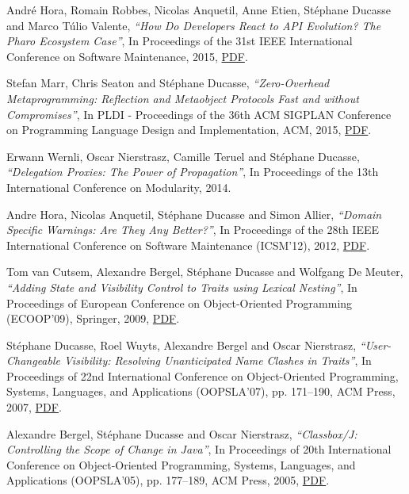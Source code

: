 \documentclass{article}
\newcommand{\czauthors}[1]{#1}
\newcommand{\cztitle}[1]{\emph{``#1''}}
\newcommand{\czbooktitle}[1]{#1}
\begin{document}
\begin{itemize}
	\pub  \czauthors{Andr\'e Hora, Romain Robbes, Nicolas Anquetil, Anne Etien, St\'ephane Ducasse and Marco T\'ulio Valente},  \cztitle{How Do Developers React to API Evolution? The Pharo Ecosystem Case},  In \czbooktitle{Proceedings of the 31st IEEE International Conference on Software Maintenance}, 2015, \href{http://rmod-files.lille.inria.fr/Team/Texts/Papers/Hora15a-icsme-api-evolution.pdf}{PDF}.

	\pub  \czauthors{Stefan Marr, Chris Seaton and St\'ephane Ducasse},  \cztitle{Zero-Overhead Metaprogramming: Reflection and Metaobject Protocols Fast and without Compromises},  In \czbooktitle{PLDI - Proceedings of the 36th ACM SIGPLAN Conference on Programming Language Design and Implementation}, ACM, 2015, \href{http://rmod-files.lille.inria.fr/Team/Texts/Papers/Marr15a-PLDI15-ZeroOverheadMetaprogramming.pdf}{PDF}.

	\pub  \czauthors{Erwann Wernli, Oscar Nierstrasz, Camille Teruel and St\'ephane Ducasse},  \cztitle{Delegation Proxies: The Power of Propagation},  In \czbooktitle{Proceedings of the 13th International Conference on Modularity}, 2014.

	\pub  \czauthors{Andre Hora, Nicolas Anquetil, St\'ephane Ducasse and Simon Allier},  \cztitle{Domain Specific Warnings: Are They Any Better?},  In \czbooktitle{Proceedings of the 28th IEEE International Conference on Software Maintenance (ICSM'12)}, 2012, \href{http://rmod-files.lille.inria.fr/Team/Texts/Papers/Hora12b-ICSM2012-DedicatedRules.pdf}{PDF}.

	\pub  \czauthors{Tom van Cutsem, Alexandre Bergel, St\'ephane Ducasse and Wolfgang De Meuter},  \cztitle{Adding State and Visibility Control to Traits using Lexical Nesting},  In \czbooktitle{Proceedings of European Conference on Object-Oriented Programming (ECOOP'09)}, Springer, 2009, \href{http://rmod-files.lille.inria.fr/Team/Texts/Papers/Cuts09a-ECOOP09-Traits.pdf}{PDF}.

	\pub  \czauthors{St\'ephane Ducasse, Roel Wuyts, Alexandre Bergel and Oscar Nierstrasz},  \cztitle{User-Changeable Visibility: Resolving Unanticipated Name Clashes in Traits},  In \czbooktitle{Proceedings of 22nd International Conference on Object-Oriented Programming, Systems, Languages, and Applications (OOPSLA'07)}, pp. 171--190, ACM Press, 2007, \href{http://rmod-files.lille.inria.fr/Team/Texts/Papers/Duca07b-FreezableTrait.pdf}{PDF}.

	\pub  \czauthors{Alexandre Bergel, St\'ephane Ducasse and Oscar Nierstrasz},  \cztitle{Classbox/{J}: Controlling the Scope of Change in {Java}},  In \czbooktitle{Proceedings of 20th International Conference on Object-Oriented Programming, Systems, Languages, and Applications (OOPSLA'05)}, pp. 177--189, ACM Press, 2005, \href{http://rmod-files.lille.inria.fr/Team/Texts/Papers/Berg05b-OOSPLA05-classboxJ.pdf}{PDF}.


\end{itemize}
\end{document}
